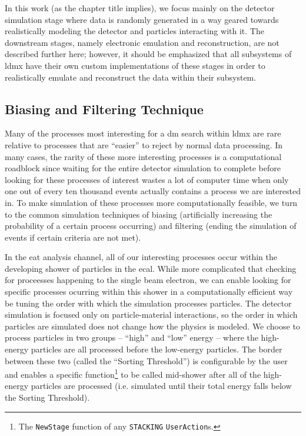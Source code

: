 In this work (as the chapter title implies), we focus mainly on the detector simulation stage where
data is randomly generated in a way geared towards
realistically modeling the detector and particles interacting with it. The downstream stages,
namely electronic emulation and reconstruction, are not described further here; however, it should
be emphasized that all subsystems of \ac{ldmx} have their own custom implementations of these
stages in order to realistically emulate and reconstruct the data within their subsystem.

\subsection{Biasing and Filtering Technique} \label{sec:bias-and-filter}
Many of the processes most interesting for a \ac{dm} search within \ac{ldmx} are rare relative to
processes that are ``easier'' to reject by normal data processing.
In many cases, the rarity of these more interesting processes is a computational roadblock
since waiting for the entire detector simulation to complete before looking for these processes
of interest wastes a lot of computer time when only one out of every ten thousand events actually
contains a process we are interested in.
To make simulation of these processes more computationally feasible, we turn to the common simulation
techniques of biasing (artificially increasing the probability of a certain process occurring) and
filtering (ending the simulation of events if certain criteria are not met).

In the \ac{eat} analysis channel, all of our interesting processes occur within the developing
shower of particles in the \ac{ecal}.
While more complicated that checking for proceesses happening to the single beam electron,
we can enable looking for specific processes ocurring within this shower in a computationally
efficient way be tuning the order with which the simulation processes particles.
The detector simulation is focused only on particle-material interactions, so the order 
in which particles are simulated does not change how the physics is modeled.
We choose to process particles in two groups -- ``high'' and ``low'' energy --
where the high-energy particles are all processed before the low-energy particles.
The border between these two (called the ``Sorting Threshold'') is configurable by the user and enables a specific function\footnote{
The \texttt{NewStage} function of any \texttt{STACKING} \texttt{UserAction}s. 
} to be called mid-shower after all of the high-energy particles are processed
(i.e. simulated until their total energy falls below the Sorting Threshold).

